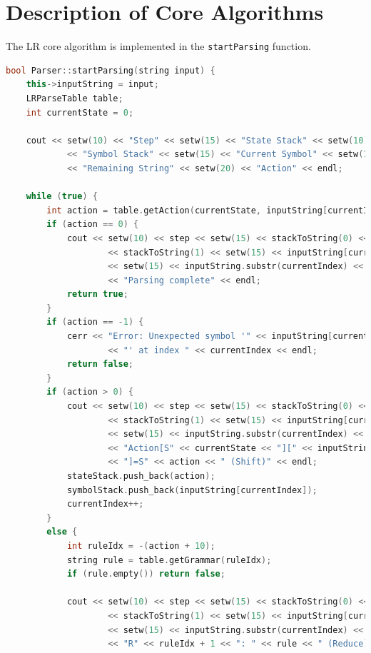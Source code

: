 \documentclass[a4paper,12pt]{article}
\begin{document}
\section{Description of Core Algorithms}
The LR core algorithm is implemented in the \texttt{startParsing} function.
\begin{lstlisting}[language=c++]
bool Parser::startParsing(string input) {
    this->inputString = input;
    LRParseTable table;
    int currentState = 0;

    cout << setw(10) << "Step" << setw(15) << "State Stack" << setw(10)
            << "Symbol Stack" << setw(15) << "Current Symbol" << setw(15)
            << "Remaining String" << setw(20) << "Action" << endl;

    while (true) {
        int action = table.getAction(currentState, inputString[currentIndex]);
        if (action == 0) {
            cout << setw(10) << step << setw(15) << stackToString(0) << setw(10)
                    << stackToString(1) << setw(15) << inputString[currentIndex]
                    << setw(15) << inputString.substr(currentIndex) << setw(20)
                    << "Parsing complete" << endl;
            return true;
        }
        if (action == -1) {
            cerr << "Error: Unexpected symbol '" << inputString[currentIndex]
                    << "' at index " << currentIndex << endl;
            return false;
        }
        if (action > 0) {
            cout << setw(10) << step << setw(15) << stackToString(0) << setw(10)
                    << stackToString(1) << setw(15) << inputString[currentIndex]
                    << setw(15) << inputString.substr(currentIndex) << setw(20)
                    << "Action[S" << currentState << "][" << inputString[currentIndex]
                    << "]=S" << action << " (Shift)" << endl;
            stateStack.push_back(action);
            symbolStack.push_back(inputString[currentIndex]);
            currentIndex++;
        }
        else {
            int ruleIdx = -(action + 10);
            string rule = table.getGrammar(ruleIdx);
            if (rule.empty()) return false;

            cout << setw(10) << step << setw(15) << stackToString(0) << setw(10)
                    << stackToString(1) << setw(15) << inputString[currentIndex]
                    << setw(15) << inputString.substr(currentIndex) << setw(20)
                    << "R" << ruleIdx + 1 << ": " << rule << " (Reduce)" << endl;


\end{lstlisting}
\end{document}
